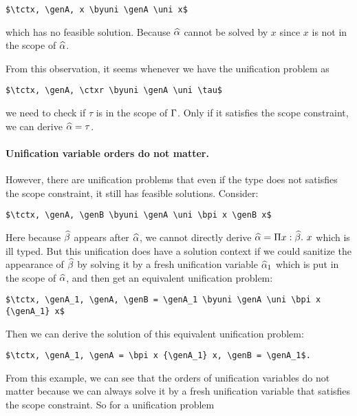 \begin{lstlisting}
$\tctx, \genA, x \byuni \genA \uni x$
\end{lstlisting}

\noindent which has no feasible solution. Because $\widehat{\alpha}$ cannot be solved by
$x$ since $x$ is not in the scope of $\widehat{\alpha}$.

From this observation, it seems whenever we have the unification problem as

\begin{lstlisting}
$\tctx, \genA, \ctxr \byuni \genA \uni \tau$
\end{lstlisting}

\noindent we need to check if $\tau$ is in the scope of $\Gamma$. Only if it
satisfies the scope constraint, we can derive $\widehat{\alpha} = \tau$.

\paragraph{Unification variable orders do not matter.}

However, there are unification problems that even if the type does not satisfies the
scope constraint, it still has feasible solutions. Consider:

\begin{lstlisting}
$\tctx, \genA, \genB \byuni \genA \uni \bpi x \genB x$
\end{lstlisting}

Here because $\widehat{\beta}$ appears after $\widehat{\alpha}$, we cannot directly derive $\widehat{\alpha} =
\Pi x:\widehat{\beta}.~ x$ which is ill typed.
But this unification does have a solution context if we could sanitize the
appearance of $\widehat{\beta}$ by solving it by a fresh unification variable $\widehat{\alpha}_1$
which is put in the scope of $\widehat{\alpha}$, and then
get an equivalent unification problem:

\begin{lstlisting}
$\tctx, \genA_1, \genA, \genB = \genA_1 \byuni \genA \uni \bpi x {\genA_1} x$
\end{lstlisting}

\noindent Then we can derive the solution of this equivalent unification problem:

\begin{lstlisting}
$\tctx, \genA_1, \genA = \bpi x {\genA_1} x, \genB = \genA_1$.
\end{lstlisting}

From this example, we can see that the orders of unification variables do not
matter because we can always solve it by a fresh unification variable that
satisfies the scope constraint. So for a unification problem


